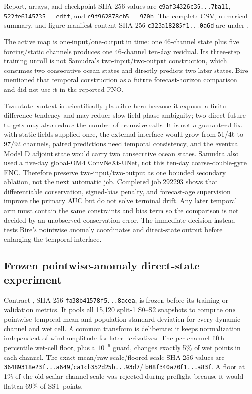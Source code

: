 \documentclass[11pt]{article}
\begin{document}
Report, arrays, and checkpoint SHA-256 values are
\texttt{e9af34326c36...7ba11}, \texttt{522fe6145735...edff}, and
\texttt{e9f962878cb5...970b}.  The complete CSV, numerical summary, and figure
manifest-content SHA-256 \texttt{c323a18285f1...0a6d} are under
.

The active map is one-input/one-output in time: one 46-channel state plus five
forcing/static channels produces one 46-channel ten-day residual.  Its three-step
training unroll is not Samudra's two-input/two-output construction, which consumes two
consecutive ocean states and directly predicts two later states.  Bire mentioned that
temporal construction as a future forecast-horizon comparison and did not use it in
the reported FNO.

Two-state context is scientifically plausible here because it exposes a finite-
difference tendency and may reduce slow-field phase ambiguity; two direct future
targets may also reduce the number of recursive calls.  It is not a guaranteed fix:
with static fields supplied once, the external interface would grow from 51/46 to
97/92 channels, paired predictions need temporal consistency, and the eventual Model D
adjoint state would carry two consecutive ocean states.  Samudra also used a five-day
global-OM4 ConvNeXt-UNet, not this ten-day coarse-double-gyre FNO.  Therefore preserve
two-input/two-output as one bounded secondary ablation, not the next automatic job.
Completed job 292293 shows that differentiable conservation, signed-bias penalty, and
forecast-age supervision improve the primary AUC but do not solve terminal drift.
Any later temporal arm must contain the same constraints and bias term so the
comparison is not decided by an unobserved conservation error.  The immediate
decision instead tests Bire's pointwise anomaly coordinates and direct-state output
before enlarging the temporal interface.

\subsection{Frozen pointwise-anomaly direct-state experiment}

Contract , SHA-256
\texttt{fa38b41578f5...8acea}, is frozen before its training or validation metrics.
It pools all 15,120 split-1 S0--S2 snapshots to compute one pointwise temporal mean
and population standard deviation for every dynamic channel and wet cell.  A common
transform is deliberate: it keeps normalization independent of wind amplitude for
later derivatives.  The per-channel fifth-percentile wet-cell floor, plus a
\(10^{-6}\) guard, changes exactly 5\% of wet points in each channel.  The exact
mean/raw-scale/floored-scale SHA-256 values are
\texttt{36489318e23f...a649}/\texttt{ca1cb352d25b...93d7}/
\texttt{b08f340a70f1...a83f}.  A floor at 1\% of the old scalar channel scale was
rejected during preflight because it would flatten 69\% of SST points.
\end{document}
